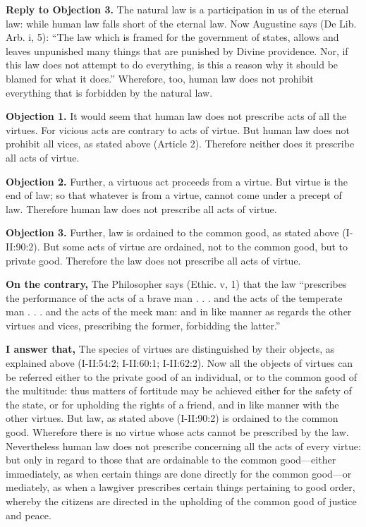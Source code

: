 \textbf{Reply to Objection 3.} The natural law is a participation in us of the eternal law: while human law falls short of the eternal law. Now Augustine says (De Lib. Arb. i, 5): ``The law which is framed for the government of states, allows and leaves unpunished many things that are punished by Divine providence. Nor, if this law does not attempt to do everything, is this a reason why it should be blamed for what it does.'' Wherefore, too, human law does not prohibit everything that is forbidden by the natural law.


\textbf{Objection 1.} It would seem that human law does not prescribe acts of all the virtues. For vicious acts are contrary to acts of virtue. But human law does not prohibit all vices, as stated above (Article 2). Therefore neither does it prescribe all acts of virtue.

\textbf{Objection 2.} Further, a virtuous act proceeds from a virtue. But virtue is the end of law; so that whatever is from a virtue, cannot come under a precept of law. Therefore human law does not prescribe all acts of virtue.

\textbf{Objection 3.} Further, law is ordained to the common good, as stated above (I-II:90:2). But some acts of virtue are ordained, not to the common good, but to private good. Therefore the law does not prescribe all acts of virtue.

\textbf{On the contrary,} The Philosopher says (Ethic. v, 1) that the law ``prescribes the performance of the acts of a brave man . . . and the acts of the temperate man . . . and the acts of the meek man: and in like manner as regards the other virtues and vices, prescribing the former, forbidding the latter.''

\textbf{I answer that,} The species of virtues are distinguished by their objects, as explained above (I-II:54:2; I-II:60:1; I-II:62:2). Now all the objects of virtues can be referred either to the private good of an individual, or to the common good of the multitude: thus matters of fortitude may be achieved either for the safety of the state, or for upholding the rights of a friend, and in like manner with the other virtues. But law, as stated above (I-II:90:2) is ordained to the common good. Wherefore there is no virtue whose acts cannot be prescribed by the law. Nevertheless human law does not prescribe concerning all the acts of every virtue: but only in regard to those that are ordainable to the common good—either immediately, as when certain things are done directly for the common good—or mediately, as when a lawgiver prescribes certain things pertaining to good order, whereby the citizens are directed in the upholding of the common good of justice and peace.

